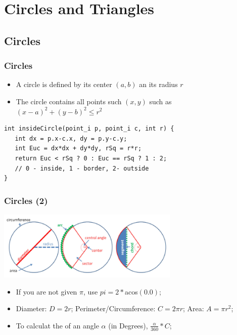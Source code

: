 \documentclass{beamer}
\begin{document}
\section{Circles and Triangles}
\subsection{Circles}
\begin{frame}
  \frametitle{Circles}
  {\smaller
  \begin{itemize}
  \item A circle is defined by its center $(a,b)$ an its radius $r$
  \item The circle contains all points such $(x,y)$ such as $(x-a)^2+(y-b)^2 \leq r^2$
  \end{itemize}

  \begin{exampleblock}{}
\begin{verbatim}
int insideCircle(point_i p, point_i c, int r) {
   int dx = p.x-c.x, dy = p.y-c.y;
   int Euc = dx*dx + dy*dy, rSq = r*r;
   return Euc < rSq ? 0 : Euc == rSq ? 1 : 2; 
   // 0 - inside, 1 - border, 2- outside
}
\end{verbatim}
  \end{exampleblock}
  }
\end{frame}


\begin{frame}
  \frametitle{Circles (2)}
  {\smaller

    \begin{center}
      \includegraphics[width=0.65\textwidth]{../img/circle_halim}
    \end{center}

    \begin{itemize}
      \item If you are not given $\pi$, use $pi = 2*$acos$(0.0)$;
      \item Diameter: $D=2r$; Perimeter/Circumference: $C=2\pi r$; Area: $A=\pi r^2$;
      \item To calculat the  of an angle $\alpha$ (in Degrees), $\frac{\alpha}{360}*C$;
    \end{itemize}
  }
\end{frame}
\end{document}
